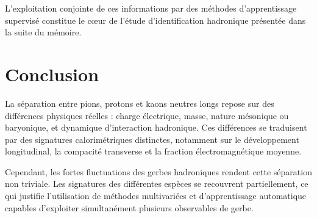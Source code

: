 L'exploitation conjointe de ces informations par des méthodes d'apprentissage supervisé constitue le cœur de l'étude d'identification hadronique présentée dans la suite du mémoire.

\section{Conclusion}
\label{sec:conclusion-pid-physique}

La séparation entre pions, protons et kaons neutres longs repose sur des différences physiques réelles : charge électrique, masse, nature mésonique ou baryonique, et dynamique d'interaction hadronique. Ces différences se traduisent par des signatures calorimétriques distinctes, notamment sur le développement longitudinal, la compacité transverse et la fraction électromagnétique moyenne.

Cependant, les fortes fluctuations des gerbes hadroniques rendent cette séparation non triviale. Les signatures des différentes espèces se recouvrent partiellement, ce qui justifie l'utilisation de méthodes multivariées et d'apprentissage automatique capables d'exploiter simultanément plusieurs observables de gerbe.
